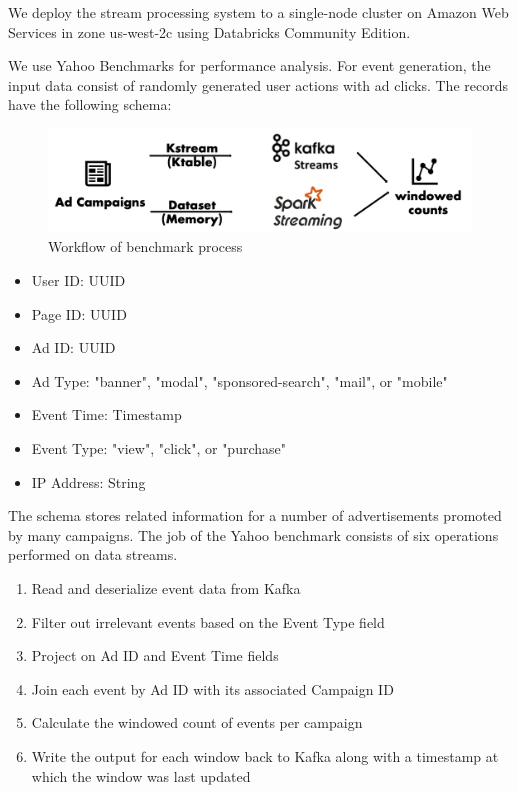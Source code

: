 \documentclass[pdftex,twocolumn,10pt,letterpaper]{article}
\begin{document}
We deploy the stream processing system to a single-node cluster on Amazon Web Services in zone us-west-2c using Databricks Community Edition. 

We use Yahoo Benchmarks\cite{7530084} for performance analysis. For event generation, the input data consist of randomly generated user actions with ad clicks. The records have the following schema: 


\begin{figure}
    \centering
    \includegraphics[width=\linewidth]{dataflow.png}
    \caption{Workflow of benchmark process}
    \label{fig:workflow}
\end{figure}

\begin{itemize}
    \item User ID: UUID
    \item Page ID: UUID
    \item Ad ID: UUID
    \item Ad Type: "banner", "modal", "sponsored-search", "mail", or "mobile"
    \item Event Time: Timestamp
    \item Event Type: "view", "click", or "purchase"
    \item IP Address: String
\end{itemize}


The schema stores related information for a number of advertisements promoted by many campaigns. The job of the Yahoo benchmark consists of six operations performed on data streams.

\begin{enumerate}
    \item Read and deserialize event data from Kafka
    \item Filter out irrelevant events based on the Event Type field
    \item Project on Ad ID and Event Time fields
    \item Join each event by Ad ID with its associated Campaign ID
    \item Calculate the windowed count of events per campaign
    \item Write the output for each window back to Kafka along with a timestamp at which the window was last updated
\end{enumerate}
\end{document}
